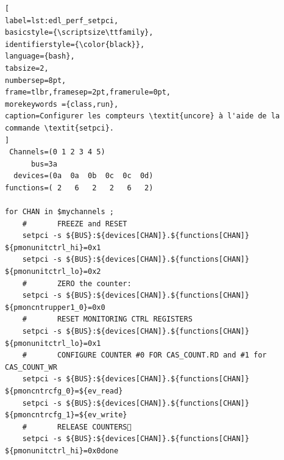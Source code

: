 \begin{minipage}{\linewidth}
\begin{lstlisting}[
label=lst:edl_perf_setpci,
basicstyle={\scriptsize\ttfamily},
identifierstyle={\color{black}},
language={bash},
tabsize=2,
numbersep=8pt,
frame=tlbr,framesep=2pt,framerule=0pt,
morekeywords ={class,run},
caption=Configurer les compteurs \textit{uncore} à l'aide de la commande \textit{setpci}.
]
 Channels=(0 1 2 3 4 5)
      bus=3a
  devices=(0a  0a  0b  0c  0c  0d)
functions=( 2   6   2   2   6   2)

for CHAN in $mychannels ;
    #       FREEZE and RESET
    setpci -s ${BUS}:${devices[CHAN]}.${functions[CHAN]} ${pmonunitctrl_hi}=0x1        
    setpci -s ${BUS}:${devices[CHAN]}.${functions[CHAN]} ${pmonunitctrl_lo}=0x2
    #       ZERO the counter:        
    setpci -s ${BUS}:${devices[CHAN]}.${functions[CHAN]} ${pmoncntrupper1_0}=0x0  
    #       RESET MONITORING CTRL REGISTERS        
    setpci -s ${BUS}:${devices[CHAN]}.${functions[CHAN]} ${pmonunitctrl_lo}=0x1
    #       CONFIGURE COUNTER #0 FOR CAS_COUNT.RD and #1 for CAS_COUNT_WR        
    setpci -s ${BUS}:${devices[CHAN]}.${functions[CHAN]} ${pmoncntrcfg_0}=${ev_read}        
    setpci -s ${BUS}:${devices[CHAN]}.${functions[CHAN]} ${pmoncntrcfg_1}=${ev_write}
    #       RELEASE COUNTERS        
    setpci -s ${BUS}:${devices[CHAN]}.${functions[CHAN]} ${pmonunitctrl_hi}=0x0done
\end{lstlisting}
\end{minipage}
    
    
    
    
